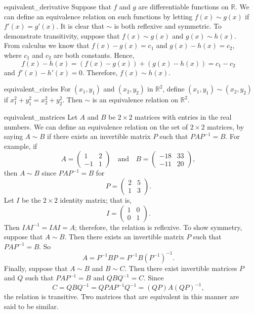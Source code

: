 \begin{example}{equivalent_derivative}
Suppose that $f$ and $g$ are differentiable functions on ${\mathbb R}$.  We can define an equivalence relation on such functions by letting $f(x) \sim g(x)$ if $f'(x) = g'(x)$. It is clear that $\sim$ is both reflexive and symmetric.  To demonstrate transitivity, suppose that $f(x) \sim g(x)$ and  $g(x) \sim h(x)$.  From calculus we know that $f(x) - g(x) = c_1$ and $g(x)- h(x) = c_2$, where $c_1$ and $c_2$ are both constants. Hence, 
\[
f(x) - h(x) = ( f(x) - g(x)) + ( g(x)- h(x))  = c_1 - c_2
\]
and $f'(x) - h'(x) =0$. Therefore, $f(x) \sim h(x)$.
\end{example}

\begin{example}{equivalent_circles}
For $(x_1, y_1 )$ and $(x_2, y_2)$ in ${\mathbb R}^2$, define $(x_1, y_1 ) \sim (x_2, y_2)$ if $x_1^2 + y_1^2 = x_2^2 + y_2^2$.  Then $\sim$ is an equivalence relation on ${\mathbb R}^2$.
\end{example}

\begin{example}{equivalent_matrices}
Let $A$ and $B$ be $2 \times 2$ matrices with entries in the real numbers. We can define an equivalence relation on the set of $2 \times 2$ matrices, by saying $A \sim B$ if there exists an invertible matrix $P$ such that $PAP^{-1} = B$.  For example, if 
\[
A =
\begin{pmatrix}
1 & 2 \\
-1 & 1
\end{pmatrix}
\quad \text{and} \quad
B =
\begin{pmatrix}
-18 & 33 \\
-11 & 20
\end{pmatrix},
\]
then $A \sim B$ since $PAP^{-1} = B$ for
\[
P =
\begin{pmatrix}
2 & 5 \\
1 & 3
\end{pmatrix}.
\]
Let $I$ be the $2 \times 2$ identity matrix; that is,
\[
I =
\begin{pmatrix}
1 & 0 \\
0 & 1
\end{pmatrix}.
\]
Then $IAI^{-1} = IAI = A$; therefore, the relation is reflexive.  To show symmetry, suppose that $A \sim B$.  Then there exists an invertible matrix $P$ such that $PAP^{-1} = B$.  So 
\[
A = P^{-1} B P = P^{-1} B (P^{-1})^{-1}.
\]
Finally, suppose that $A \sim B$ and $B \sim C$.  Then there exist invertible matrices $P$ and $Q$ such that $PAP^{-1} = B$ and  $QBQ^{-1} = C$.  Since 
\[
C = QBQ^{-1} = QPAP^{-1} Q^{-1} = (QP)A(QP)^{-1},
\]
the relation is transitive.  Two matrices that are equivalent in this manner are said to be {\bfi similar}. 
\end{example}

